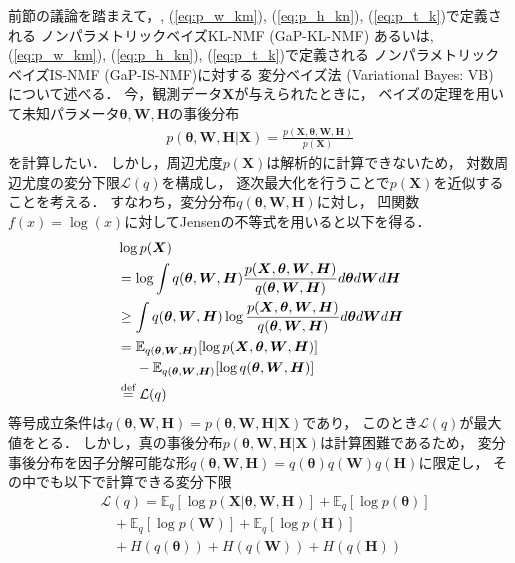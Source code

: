 前節の議論を踏まえて，, (\ref{eq:p_w_km}),
(\ref{eq:p_h_kn}), (\ref{eq:p_t_k})で定義される
ノンパラメトリックベイズKL-NMF (GaP-KL-NMF)
あるいは, (\ref{eq:p_w_km}),
        (\ref{eq:p_h_kn}), (\ref{eq:p_t_k})で定義される
ノンパラメトリックベイズIS-NMF (GaP-IS-NMF)に対する
変分ベイズ法 (Variational Bayes: VB) について述べる．
今，観測データ$\bm{X}$が与えられたときに，
ベイズの定理を用いて未知パラメータ$\bm\theta,\bm{W},\bm{H}$の事後分布
\begin{eqnarray}
 p(\bm\theta,\bm{W},\bm{H} | \bm{X}) 
 = \frac{p(\bm{X}, \bm\theta,\bm{W},\bm{H})}{p(\bm{X})}
\end{eqnarray}
を計算したい．
しかし，周辺尤度$p(\bm{X})$は解析的に計算できないため，
対数周辺尤度の変分下限$\mathcal{L}(q)$を構成し，
逐次最大化を行うことで$p(\bm{X})$を近似することを考える．
すなわち，変分分布$q(\bm\theta,\bm{W},\bm{H})$に対し，
凹関数$f(x)=\log(x)$に対してJensenの不等式を用いると以下を得る．
\begin{align}
&
 \log p(\bm{X})
 \nonumber\\
&
 = \log \int q(\bm\theta,\bm{W},\bm{H}) 
 \frac{p(\bm{X},\bm\theta,\bm{W},\bm{H})}{q(\bm\theta,\bm{W},\bm{H})} d\bm\theta d\bm{W} d\bm{H}
 \nonumber\\
&
 \ge \int q(\bm\theta,\bm{W},\bm{H}) 
 \log \frac{p(\bm{X},\bm\theta,\bm{W},\bm{H})}{q(\bm\theta,\bm{W},\bm{H})} d\bm\theta d\bm{W} d\bm{H}
 \nonumber\\
&
 = \mathbb{E}_{q(\bm\theta,\bm{W},\bm{H})}[\log p(\bm{X},\bm\theta,\bm{W},\bm{H})]
 \nonumber\\
& \ \ \ \
 - \mathbb{E}_{q(\bm\theta,\bm{W},\bm{H})}[\log q(\bm\theta,\bm{W},\bm{H})]
 \nonumber\\
&
 \overset{\mbox{\scriptsize def}}{=} \mathcal{L}(q)
\end{align}
等号成立条件は$q(\bm\theta,\bm{W},\bm{H}) = p(\bm\theta,\bm{W},\bm{H}|\bm{X})$であり，
このとき$\mathcal{L}(q)$が最大値をとる．
しかし，真の事後分布$p(\bm\theta,\bm{W},\bm{H} | \bm{X})$は計算困難であるため，
変分事後分布を因子分解可能な形$q(\bm\theta,\bm{W},\bm{H}) = q(\bm\theta) q(\bm{W}) q(\bm{H})$に限定し，
その中でも以下で計算できる変分下限
\begin{align}
&
 \mathcal{L}(q) = \mathbb{E}_{q}[\log p(\bm{X}|\bm\theta,\bm{W},\bm{H})]
 + \mathbb{E}_{q}[\log p(\bm\theta)]
 \nonumber\\
& \ \ \ \
 + \mathbb{E}_{q}[\log p(\bm{W})]
 + \mathbb{E}_{q}[\log p(\bm{H})]
 \nonumber\\
& \ \ \ \
 + H(q(\bm\theta)) + H(q(\bm{W})) + H(q(\bm{H}))
 \label{eq:lb}
\end{align}
